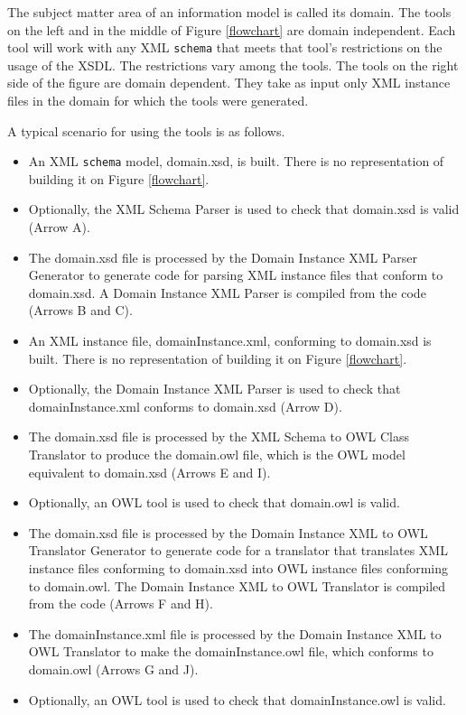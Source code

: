 \documentclass[preprint,12pt]{elsarticle}
\begin{document}
The subject matter area of an information model is called its domain. The
tools on the left and in the middle of Figure \ref{flowchart} are domain
independent. Each tool will work with any XML {\tt schema} that meets that
tool's restrictions on the usage of the XSDL. The restrictions vary among
the tools. The tools on the right side of the figure are domain dependent.
They take as input only XML instance files in the domain for which the
tools were generated.

A typical scenario for using the tools is as follows.

\begin{itemize}
\item An XML {\tt schema} model, domain.xsd, is built. There is no
  representation of building it on Figure \ref{flowchart}.
\item Optionally, the XML Schema Parser is used to check that domain.xsd
  is valid (Arrow A).
\item The domain.xsd file is processed by the Domain Instance XML Parser
  Generator to generate code for parsing XML instance files that conform to
  domain.xsd. A Domain Instance XML Parser is compiled from the code
  (Arrows B and C).
\item An XML instance file, domainInstance.xml, conforming to domain.xsd is
  built. There is no representation of building it on Figure \ref{flowchart}. 
\item Optionally, the Domain Instance XML Parser is used to check that
  domainInstance.xml conforms to domain.xsd (Arrow D).
\item The domain.xsd file is processed by the XML Schema to OWL Class
  Translator to produce the domain.owl file, which is the OWL model
  equivalent to domain.xsd (Arrows E and I).
\item Optionally, an OWL tool is used to check that domain.owl is valid.
\item The domain.xsd file is processed by the Domain Instance XML to OWL
  Translator Generator to generate code for a translator that translates
  XML instance files conforming to domain.xsd into OWL instance files
  conforming to domain.owl. The Domain Instance XML to OWL Translator is
  compiled from the code (Arrows F and H).
\item The domainInstance.xml file is processed by the Domain Instance XML
  to OWL Translator to make the domainInstance.owl file, which conforms
  to domain.owl (Arrows G and J).
\item Optionally, an OWL tool is used to check that domainInstance.owl is
  valid.
\end{itemize}
\end{document}
